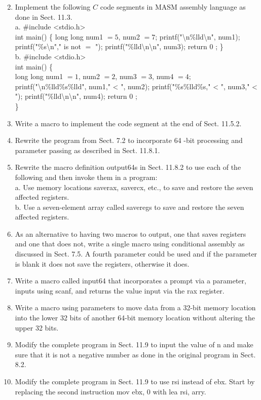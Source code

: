 \documentclass[10pt]{article}
\begin{document}
\begin{enumerate}
  \setcounter{enumi}{1}
  \item Implement the following $C$ code segments in MASM assembly language as done in Sect. 11.3.\\
a. \#include <stdio.h>\\
int main() \{ long long num1 $=5$, num2 $=7$; printf("\textbackslash n\%lld\textbackslash n", num1); printf("\%s\textbackslash n"," is not $=$ "); printf("\%lld\textbackslash n\textbackslash n", num3); return 0 ; \}\\
b. \#include <stdio.h>\\
int main() \{\\
long long num1 $=1$, num2 $=2$, num3 $=3$, num4 $=4$; printf("\textbackslash n\%lld\%s\%lld", num1," < ", num2); printf("\%s\%lld\%s," < ", num3," < "); printf("\%lld\textbackslash n\textbackslash n", num4); return 0 ;\\
\}
  \item Write a macro to implement the code segment at the end of Sect. 11.5.2.
  \item Rewrite the program from Sect. 7.2 to incorporate 64 -bit processing and parameter passing as described in Sect. 11.8.1.
  \item Rewrite the macro definition output64s in Sect. 11.8.2 to use each of the following and then invoke them in a program:\\
a. Use memory locations saverax, savercx, etc., to save and restore the seven affected registers.\\
b. Use a seven-element array called saveregs to save and restore the seven affected registers.
  \item As an alternative to having two macros to output, one that saves registers and one that does not, write a single macro using conditional assembly as discussed in Sect. 7.5. A fourth parameter could be used and if the parameter is blank it does not save the registers, otherwise it does.
  \item Write a macro called input64 that incorporates a prompt via a parameter, inputs using scanf, and returns the value input via the rax register.
  \item Write a macro using parameters to move data from a 32-bit memory location into the lower 32 bits of another 64-bit memory location without altering the upper 32 bits.
  \item Modify the complete program in Sect. 11.9 to input the value of n and make sure that it is not a negative number as done in the original program in Sect. 8.2.
  \item Modify the complete program in Sect. 11.9 to use rsi instead of ebx. Start by replacing the second instruction mov ebx, 0 with lea rsi, arry.
\end{enumerate}
\end{document}
